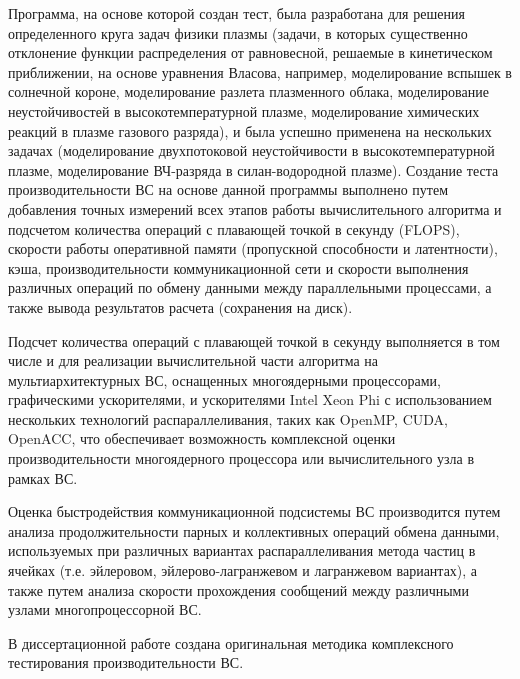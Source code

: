 Программа, на основе которой создан тест, была разработана для решения определенного круга задач физики плазмы (задачи, в которых существенно отклонение функции распределения от равновесной, решаемые в кинетическом приближении, на основе уравнения Власова, например, моделирование вспышек в солнечной короне, моделирование разлета плазменного облака, моделирование неустойчивостей в высокотемпературной плазме, моделирование химических реакций в плазме газового разряда), и была успешно применена на нескольких задачах (моделирование двухпотоковой неустойчивости в высокотемпературной плазме, моделирование ВЧ-разряда в силан-водородной плазме). Создание теста производительности ВС на основе данной программы выполнено путем добавления точных измерений всех этапов работы вычислительного алгоритма и подсчетом количества операций с плавающей точкой в секунду (FLOPS), скорости работы оперативной памяти (пропускной способности и латентности), кэша, производительности коммуникационной сети и скорости выполнения различных операций по обмену данными между параллельными процессами, а также вывода результатов расчета (сохранения на диск).

Подсчет количества операций с плавающей точкой в секунду выполняется в том числе и  для реализации вычислительной части алгоритма на мультиархитектурных ВС, оснащенных многоядерными процессорами, графическими ускорителями, и ускорителями Intel Xeon Phi с использованием нескольких технологий распараллеливания, таких как OpenMP, CUDA, OpenACC, что обеспечивает возможность комплексной оценки производительности многоядерного  процессора или вычислительного узла в рамках ВС.

Оценка быстродействия коммуникационной подсистемы ВС производится путем анализа продолжительности парных и коллективных операций обмена данными, используемых при различных вариантах распараллеливания метода частиц в ячейках (т.е. эйлеровом, эйлерово-лагранжевом и лагранжевом вариантах), а также путем анализа скорости прохождения сообщений между различными узлами многопроцессорной ВС.    

В диссертационной работе создана оригинальная методика комплексного тестирования производительности ВС.

